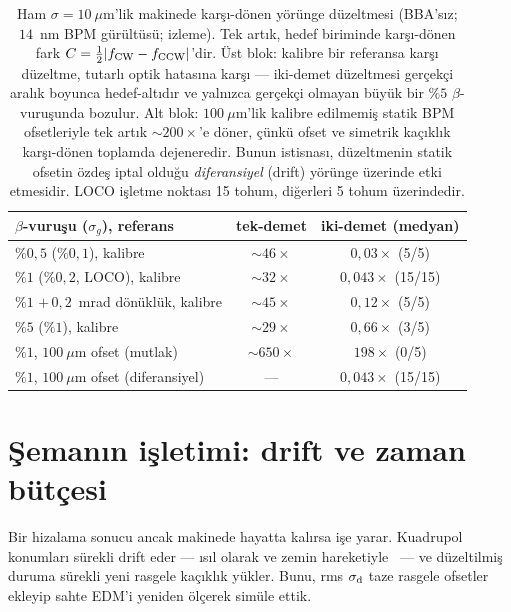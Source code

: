 \documentclass[aps,prab,reprint,superscriptaddress,nofootinbib]{revtex4-2}
\begin{document}
\begin{table}[tb]
\caption{Ham $\sigma=10~\mu$m'lik makinede karşı-dönen yörünge düzeltmesi (BBA'sız;
$14$~nm BPM gürültüsü; izleme). Tek artık, hedef biriminde karşı-dönen fark
$C=\tfrac12|f_{\rm CW}-f_{\rm CCW}|$'dir. Üst blok: kalibre bir referansa karşı
düzeltme, tutarlı optik hatasına karşı --- iki-demet düzeltmesi gerçekçi aralık
boyunca hedef-altıdır ve yalnızca gerçekçi olmayan büyük bir $\%5$ $\beta$-vuruşunda
bozulur. Alt blok: $100~\mu$m'lik kalibre edilmemiş statik BPM ofsetleriyle tek artık
$\sim\!200\times$'e döner, çünkü ofset ve simetrik kaçıklık karşı-dönen toplamda
dejeneredir. Bunun istisnası, düzeltmenin statik ofsetin özdeş iptal olduğu
\emph{diferansiyel} (drift) yörünge üzerinde etki etmesidir. LOCO işletme noktası 15
tohum, diğerleri 5 tohum üzerindedir.}
\label{tab:twobeam}
\small
\begin{ruledtabular}
\begin{tabular}{lcc}
$\beta$-vuruşu ($\sigma_g$), referans & tek-demet & iki-demet (medyan) \\
\hline
$\%0{,}5$ ($\%0{,}1$), kalibre        & $\sim\!46\times$ & $0{,}03\times$ \;(5/5) \\
$\%1$ ($\%0{,}2$, LOCO), kalibre     & $\sim\!32\times$ & $0{,}043\times$ \;(15/15) \\
$\%1$ $+\,0{,}2$~mrad dönüklük, kalibre & $\sim\!45\times$ & $0{,}12\times$ \;(5/5) \\
$\%5$ ($\%1$), kalibre             & $\sim\!29\times$ & $0{,}66\times$ \;(3/5) \\
\hline
$\%1$, $100~\mu$m ofset (mutlak)   & $\sim\!650\times$ & $198\times$ \;(0/5) \\
$\%1$, $100~\mu$m ofset (diferansiyel) & --- & $0{,}043\times$ \;(15/15) \\
\end{tabular}
\end{ruledtabular}
\end{table}


\section{Şemanın işletimi: drift ve zaman bütçesi}
\label{sec:operation}

Bir hizalama sonucu ancak makinede hayatta kalırsa işe yarar. Kuadrupol konumları
sürekli drift eder --- ısıl olarak ve zemin hareketiyle~\cite{rossbach} --- ve
düzeltilmiş duruma sürekli yeni rasgele kaçıklık yükler. Bunu, rms $\sigma_{\rm d}$
taze rasgele ofsetler ekleyip sahte EDM'i yeniden ölçerek simüle ettik.
\end{document}
